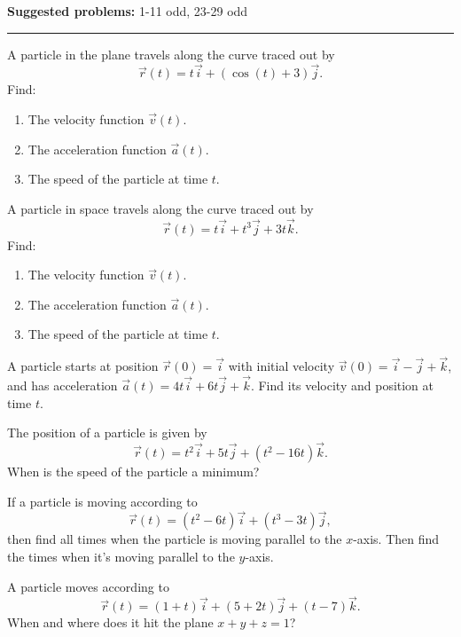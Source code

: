 \documentclass[12pt,reqno]{amsart}
\begin{document}
\textbf{Suggested problems:} 1-11 odd, 23-29 odd

\bigskip
\hrule

\bigskip
\prob A particle in the plane travels along the curve traced out by
	\[\vec{r}(t) = t\vec{i} + (\cos{(t)}+3)\vec{j}.
	\]
Find:

\medskip
\begin{enumerate}
\item The velocity function $\vec{v}(t)$.\vfill
\item The acceleration function $\vec{a}(t)$.\vfill
\item The speed of the particle at time $t$.
\end{enumerate}

\vfill
\prob A particle in space travels along the curve traced out by
	\[\vec{r}(t) = t\vec{i}+t^3\vec{j}+3t\vec{k}.
	\]
Find:

\medskip
\begin{enumerate}
\item The velocity function $\vec{v}(t)$.\vfill
\item The acceleration function $\vec{a}(t)$.\vfill
\item The speed of the particle at time $t$.
\end{enumerate}

\vfill
\newpage
\prob A particle starts at position $\vec{r}(0)=\vec{i}$ with initial velocity $\vec{v}(0) = \vec{i}-\vec{j}+\vec{k}$, and has acceleration $\vec{a}(t) = 4t\vec{i}+6t\vec{j}+\vec{k}$. Find its velocity and position at time $t$.

\vfill
\prob The position of a particle is given by
	\[\vec{r}(t) = t^2\vec{i}+5t\vec{j}+(t^2-16t)\vec{k}.
	\]
When is the speed of the particle a minimum?

\vfill
\prob If a particle is moving according to
	\[\vec{r}(t) = (t^2 - 6t)\vec{i}+ (t^3 - 3t)\vec{j},
	\]
then find all times when the particle is moving parallel to the $x$-axis. Then find the times when it's moving parallel to the $y$-axis.

\vfill
\prob A particle moves according to
	\[\vec{r}(t) = (1+t)\vec{i}+(5+2t)\vec{j}+(t-7)\vec{k}.
	\]
When and where does it hit the plane $x+y+z=1$?

\vfill
\end{document}
